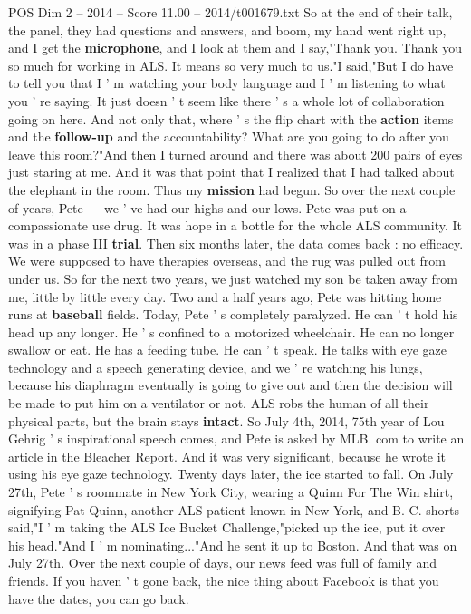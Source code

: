 \begin{textsample}{POS Dim 2 – 2014 – Score 11.00 – 2014/t001679.txt}
So at the end of their talk, the panel, they had questions and answers, and boom, my hand went right up, and I get the \textbf{microphone}, and I look at them and I say,"Thank you.
Thank you so much for working in ALS.
It means so very much to us."I said,"But I do have to tell you that I ' m watching your body language and I ' m listening to what you ' re saying.
It just doesn ' t seem like there ' s a whole lot of collaboration going on here.
And not only that, where ' s the flip chart with the \textbf{action} items and the \textbf{follow-up} and the accountability?
What are you going to do after you leave this room?"And then I turned around and there was about 200 pairs of eyes just staring at me.
And it was that point that I realized that I had talked about the elephant in the room.
Thus my \textbf{mission} had begun.
So over the next couple of years, Pete — we ' ve had our highs and our lows.
Pete was put on a compassionate use drug.
It was hope in a bottle for the whole ALS community.
It was in a phase III \textbf{trial}.
Then six months later, the data comes back : no efficacy.
We were supposed to have therapies overseas, and the rug was pulled out from under us.
So for the next two years, we just watched my son be taken away from me, little by little every day.
Two and a half years ago, Pete was hitting home runs at \textbf{baseball} fields.
Today, Pete ' s completely paralyzed.
He can ' t hold his head up any longer.
He ' s confined to a motorized wheelchair.
He can no longer swallow or eat.
He has a feeding tube.
He can ' t speak.
He talks with eye gaze technology and a speech generating device, and we ' re watching his lungs, because his diaphragm eventually is going to give out and then the decision will be made to put him on a ventilator or not.
ALS robs the human of all their physical parts, but the brain stays \textbf{intact}.
So July 4th, 2014, 75th year of Lou Gehrig ' s inspirational speech comes, and Pete is asked by MLB. com to write an article in the Bleacher Report.
And it was very significant, because he wrote it using his eye gaze technology.
Twenty days later, the ice started to fall.
On July 27th, Pete ' s roommate in New York City, wearing a Quinn For The Win shirt, signifying Pat Quinn, another ALS patient known in New York, and B.
C. shorts said,"I ' m taking the ALS Ice Bucket Challenge,"picked up the ice, put it over his head."And I ' m nominating..."And he sent it up to Boston.
And that was on July 27th.
Over the next couple of days, our news feed was full of family and friends.
If you haven ' t gone back, the nice thing about Facebook is that you have the dates, you can go back.

\end{textsample}
